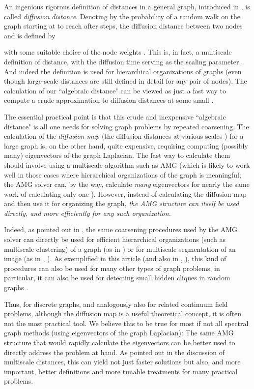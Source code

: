 \documentclass[final]{siamltex}
\begin{document}
An ingenious rigorous definition of distances in a general graph,
introduced in \cite{diffusion-maps}, is called {\it diffusion distance}. Denoting
by  the probability of a random walk on the graph
starting at  to reach  after  steps, the diffusion
distance between two nodes  and  is defined by

with some suitable choice of the node weights . This is, in fact,
a multiscale definition of distance, with the diffusion time 
serving as the scaling parameter. And indeed the definition is
used for hierarchical organizations of graphs (even though
large-scale distances are still defined in detail for any pair of
nodes). The calculation of our ``algebraic distance" can be viewed
as just a fast way to compute a crude approximation to diffusion
distances at some small .

The essential practical point is that this crude and inexpensive ``algebraic
distance" is all one needs for solving graph problems by repeated
coarsening. The calculation of the {\it diffusion map} (the diffusion
distances at various scales ) for a large graph is, on the other hand, quite expensive,
requiring computing (possibly many) eigenvectors of the graph Laplacian.
The fast way to calculate them should involve using a multiscale algorithm
such as AMG (which is likely to work well in those cases
where hierarchical organizations of the graph is meaningful; the
AMG solver can, by the way, calculate {\it many} eigenvectors for
nearly the same work of calculating only one \cite{Dan2}). However,
instead of calculating the diffusion map and then use it for
organizing the graph, {\it the AMG structure can itself be used directly,
and more efficiently for any such organization.}

Indeed, as pointed out in \cite{amg}, the same coarsening procedures used
by the AMG solver can directly be used for efficient
hierarchical organizations (such as multiscale clustering) of a graph
(as in \cite{Dan1}) or for multiscale segmentation of an image (as in \cite{segm}, \cite{Nature}). As
exemplified in this article (and also in \cite{safro2004}, \cite{safro2005}), this kind
of procedures can also be used for many other types of graph
problems, in particular, it can also be used for detecting small hidden cliques in random graphs \cite{feige-ron-2010}.

Thus, for discrete graphs, and analogously also for related
continuum field problems, although the diffusion map is a useful theoretical concept, it is often not the most practical
tool. We believe this to be true for most if not all spectral
graph methods (using eigenvectors of the graph Laplacian): The
same AMG structure that would rapidly calculate the eigenvectors can be
better used to directly address the problem at hand. As
pointed out in the discussion of multiscale distances, this can yield not just
faster solutions but also, and more important, better
definitions and more tunable treatments for many practical
problems.
\end{document}
